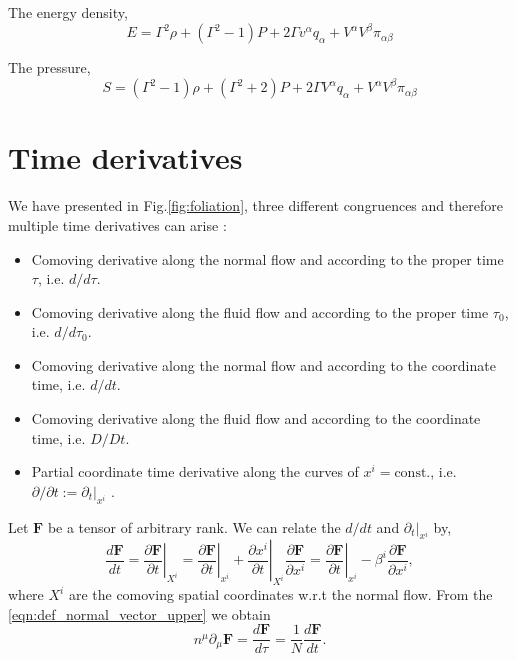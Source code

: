 The energy density,
\begin{equation}
    E=\Gamma^2 \rho + (\Gamma^2-1)P+2\Gamma v^\alpha q_\alpha + V^\alpha V^\beta \pi_{\alpha\beta}
    \label{eqn:general_energy_fluid_normal}
\end{equation}

The pressure,
\begin{equation}
    S=(\Gamma^2-1)\rho + (\Gamma^2+2)P+2\Gamma V^\alpha q_\alpha + V^\alpha V^\beta \pi_{\alpha\beta}
    \label{eqn:general_shear_fluid_normal}
\end{equation}




\section{Time derivatives}


We have presented in Fig.\eqref{fig:foliation}, three different congruences and therefore multiple time derivatives can arise \cite{Buchert_2020}:
\begin{itemize}
    \item Comoving derivative along the normal flow and according to the proper time $\tau$, i.e. $d/d\tau$.
    \item Comoving derivative along the fluid flow and according to the proper time $\tau_0$, i.e. $d/d\tau_0$.
    \item Comoving derivative along the normal flow and according to the coordinate time, i.e. $d/dt$.
    \item Comoving derivative along the fluid flow and according to the coordinate time, i.e. $D/Dt$.
    \item Partial coordinate time derivative along the curves of $x^i=\text{const.}$, i.e. $\partial/\partial t:=\partial_t|_{x^i}$ .
\end{itemize}

Let $\mathbf{F}$ be a tensor of arbitrary rank. We can relate the $d/dt$ and $\partial_t|_{x^i}$ by,
\begin{equation}
    \frac{d\mathbf{F}}{dt}=\left.\frac{\partial \mathbf{F}}{\partial t}\right|_{X^i}=\left.\frac{\partial \mathbf{F}}{\partial t}\right|_{x^i}+\left.\frac{\partial x^i}{\partial t}\right|_{X^i}\frac{\partial \mathbf{F}}{\partial x^i}=\left.\frac{\partial \mathbf{F}}{\partial t}\right|_{x^i}-\beta^i\frac{\partial \mathbf{F}}{\partial x^i},
    \label{eqn:normal_total_time_expression}
\end{equation}
where $X^i$ are the comoving spatial coordinates w.r.t the normal flow. From the \cref{eqn:def_normal_vector_upper} we obtain
\begin{equation}
    n^\mu\partial_\mu \mathbf{F}=\frac{d\mathbf{F}}{d\tau}=\frac{1}{N}\frac{d\mathbf{F}}{dt}.
    \label{eqn:relation_total_time_normal_vec}
\end{equation}

